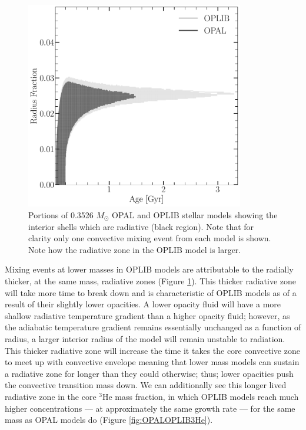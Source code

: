 \begin{figure}
	\centering
	\includegraphics[width=0.85\textwidth]{figures/jaoOpacity/SameMassConvectiveZoneComp.pdf}
	\caption{Portions of 0.3526 $M_{\odot}$ OPAL and OPLIB stellar models
	showing the interior shells which are radiative (black region). Note that
	for clarity only one convective mixing event from each model is shown. Note
	how the radiative zone in the OPLIB model is larger.}
	\label{fig:Unstable}
\end{figure}

Mixing events at lower masses in OPLIB models are attributable to the radially
thicker, at the same mass, radiative zones (Figure \ref{fig:Unstable}). This
thicker radiative zone will take more time to break down and is characteristic
of OPLIB models as of a result of their slightly lower opacities. A lower
opacity fluid will have a more shallow radiative temperature gradient than a
higher opacity fluid; however, as the adiabatic temperature gradient remains
essentially unchanged as a function of radius, a larger interior radius of the
model will remain unstable to radiation. This thicker radiative zone will
increase the time it takes the core convective zone to meet up with convective
envelope meaning that lower mass models can sustain a radiative zone for
longer than they could otherwise; thus; lower opacities push the convective
transition mass down. We can additionally see this longer lived radiative zone
in the core $^{3}$He mass fraction, in which OPLIB models reach much higher
concentrations --- at approximately the same growth rate --- for the same mass
as OPAL models do (Figure \ref{fig:OPALOPLIB3He}). 

